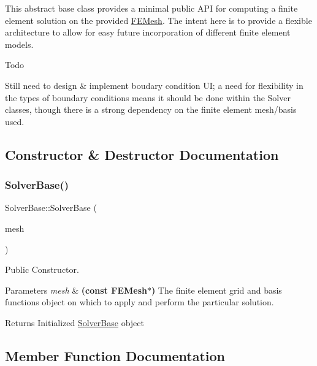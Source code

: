This abstract base class provides a minimal public A\+PI for computing a finite element solution on the provided \mbox{\hyperlink{class_f_e_mesh}{F\+E\+Mesh}}. The intent here is to provide a flexible architecture to allow for easy future incorporation of different finite element models. \begin{DoxyRefDesc}{Todo}
\item[\mbox{\hyperlink{todo__todo000010}{Todo}}]Still need to design \& implement boudary condition UI; a need for flexibility in the types of boundary conditions means it should be done within the Solver classes, though there is a strong dependency on the finite element mesh/basis used. \end{DoxyRefDesc}


\subsection{Constructor \& Destructor Documentation}
\mbox{\label{class_solver_base_ac7330a480ee6025fe3abad4f3e4bd662}} 
\subsubsection{\texorpdfstring{Solver\+Base()}{SolverBase()}}
{\footnotesize\ttfamily Solver\+Base\+::\+Solver\+Base (\begin{DoxyParamCaption}\item[{const \mbox{\hyperlink{class_f_e_mesh}{F\+E\+Mesh}} $\ast$}]{mesh }\end{DoxyParamCaption})}



Public Constructor. 


\begin{DoxyParams}{Parameters}
{\em mesh} & {\bfseries (const F\+E\+Mesh$\ast$)} The finite element grid and basis functions object on which to apply and perform the particular solution. \\
\hline
\end{DoxyParams}
\begin{DoxyReturn}{Returns}
Initialized \mbox{\hyperlink{class_solver_base}{Solver\+Base}} object 
\end{DoxyReturn}


\subsection{Member Function Documentation}
\mbox{\label{class_solver_base_a818006b80f29f641b6784905e1babe0f}} 
